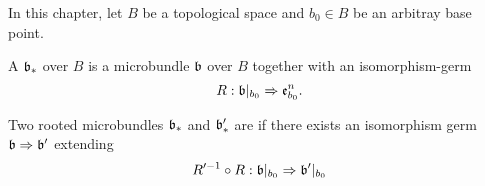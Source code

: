 In this chapter, let $B$ be a topological space and $b_0 \in B$ be an arbitray base point.
\begin{mydefinition}
    A  $\mathfrak{b}_*$ over $B$ is a microbundle $\mathfrak{b}$ over $B$ together with an isomorphism-germ
    \[ R: \mathfrak{b}\vert_{b_0} \Rightarrow \mathfrak{e}^n_{b_0}. \]

    Two rooted microbundles $\mathfrak{b}_*$ and $\mathfrak{b}'_*$ are  if there exists an isomorphism germ $\mathfrak{b} \Rightarrow \mathfrak{b}'$ extending
    \[ R'^{-1} \circ R: \mathfrak{b}\vert_{b_0} \Rightarrow \mathfrak{b}'\vert_{b_0} \]
\end{mydefinition}